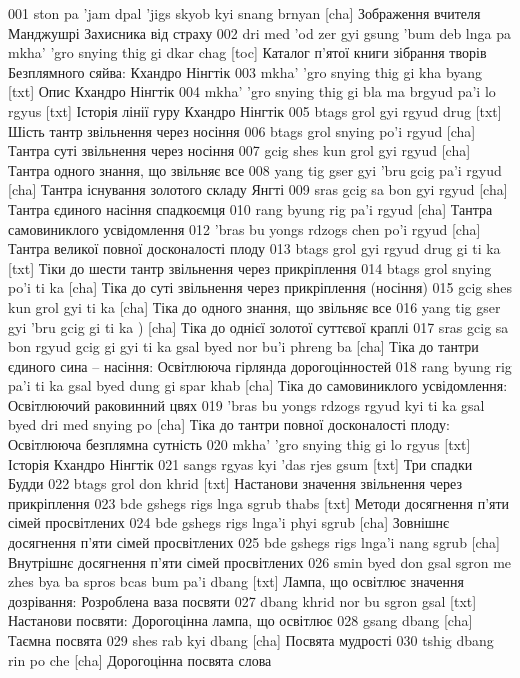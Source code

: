 \documentclass{article}
\begin{document}
001 ston pa 'jam dpal 'jigs skyob kyi snang brnyan [cha] Зображення вчителя Манджушрі Захисника від страху
002 dri med 'od zer gyi gsung 'bum deb lnga pa mkha' 'gro snying thig gi dkar chag [toc] Каталог п'ятої книги зібрання творів Безплямного сяйва: Кхандро Нінгтік
003 mkha' 'gro snying thig gi kha byang [txt] Опис Кхандро Нінгтік
004 mkha' 'gro snying thig gi bla ma brgyud pa'i lo rgyus [txt] Історія лінії гуру Кхандро Нінгтік
005 btags grol gyi rgyud drug [txt] Шість тантр звільнення через носіння
006 btags grol snying po'i rgyud [cha] Тантра суті звільнення через носіння
007 gcig shes kun grol gyi rgyud [cha] Тантра одного знання, що звільняє все
008 yang tig gser gyi 'bru gcig pa'i rgyud [cha] Тантра існування золотого складу Янгті
009 sras gcig sa bon gyi rgyud [cha] Тантра єдиного насіння спадкоємця
010 rang byung rig pa'i rgyud [cha] Тантра самовиниклого усвідомлення
012 'bras bu yongs rdzogs chen po'i rgyud [cha] Тантра великої повної досконалості плоду
013 btags grol gyi rgyud drug gi ti ka [txt] Тіки до шести тантр звільнення через прикріплення
014 btags grol snying po'i ti ka [cha] Тіка до суті звільнення через прикріплення (носіння)
015 gcig shes kun grol gyi ti ka [cha] Тіка до одного знання, що звільняє все
016 yang tig gser gyi 'bru gcig gi ti ka ) [cha] Тіка до однієї золотої суттєвої краплі
017 sras gcig sa bon rgyud gcig gi gyi ti ka gsal byed nor bu'i phreng ba [cha] Тіка до тантри єдиного сина – насіння: Освітлююча гірлянда дорогоцінностей
018 rang byung rig pa'i ti ka gsal byed dung gi spar khab [cha] Тіка до самовиниклого усвідомлення: Освітлюючий раковинний цвях
019 'bras bu yongs rdzogs rgyud kyi ti ka gsal byed dri med snying po [cha] Тіка до тантри повної досконалості плоду: Освітлююча безплямна сутність
020 mkha' 'gro snying thig gi lo rgyus [txt] Історія Кхандро Нінгтік
021 sangs rgyas kyi 'das rjes gsum [txt] Три спадки Будди
022 btags grol don khrid [txt] Настанови значення звільнення через прикріплення
023 bde gshegs rigs lnga sgrub thabs [txt] Методи досягнення п'яти сімей просвітлених
024 bde gshegs rigs lnga'i phyi sgrub [cha] Зовнішнє досягнення п'яти сімей просвітлених
025 bde gshegs rigs lnga'i nang sgrub [cha] Внутрішнє досягнення п'яти сімей просвітлених
026 smin byed don gsal sgron me zhes bya ba spros bcas bum pa'i dbang [txt] Лампа, що освітлює значення дозрівання: Розроблена ваза посвяти
027 dbang khrid nor bu sgron gsal [txt] Настанови посвяти: Дорогоцінна лампа, що освітлює
028 gsang dbang [cha] Таємна посвята
029 shes rab kyi dbang [cha] Посвята мудрості
030 tshig dbang rin po che [cha] Дорогоцінна посвята слова
\end{document}
